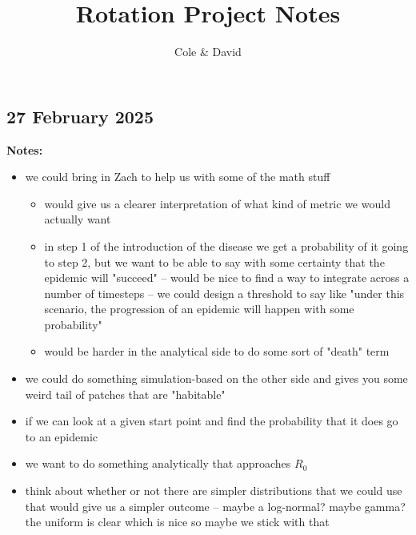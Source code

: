 \documentclass[12pt]{article}%
\begin{document}
\title{Rotation Project Notes}
\author{Cole \& David}
\maketitle

\subsection{27 February 2025}

\textbf{Notes:}
\begin{itemize}
    \item  we could bring in Zach to help us with some of the math stuff 
    \begin{itemize}
        \item would give us a clearer interpretation of what kind of metric we would actually want 
        \item in step 1 of the introduction of the disease we get a probability of it going to step 2, but we want to be able to say with some certainty that the epidemic will "succeed" -- would be nice to find a way to integrate across a number of timesteps -- we could design a threshold to say like "under this scenario, the progression of an epidemic will happen with some probability"
        \item would be harder in the analytical side to do some sort of "death" term 
    \end{itemize}
    \item we could do something simulation-based on the other side and gives you some weird tail of patches that are "habitable" 
    \item if we can look at a given start point and find the probability that it does go to an epidemic
    \item we want to do something analytically that approaches $R_0$
    \item think about whether or not there are simpler distributions that we could use that would give us a simpler outcome -- maybe a log-normal? maybe gamma? the uniform is clear which is nice so maybe we stick with that 
    \begin{figure}[!hpt]
        \centering
        \caption{}
    \end{figure}
\end{itemize}
\end{document}
